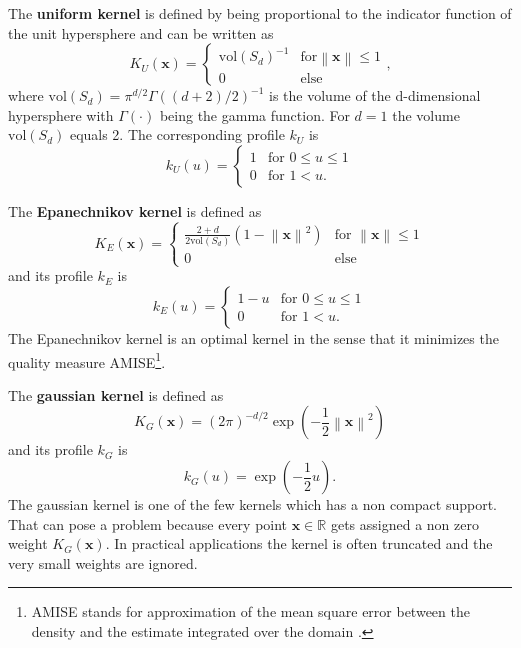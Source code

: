 \documentclass{article}
\newcommand{\norm}[1]{\left\lVert#1\right\rVert}
\begin{document}
The \textbf{uniform kernel} is defined by being proportional to the indicator function of the unit hypersphere and can be written as
\begin{equation}
	K_U(\bm{x}) = \begin{cases}
		\text{vol}(S_d)^{-1} & \text{for} \norm{\bm{x}} \leq 1\\
		0 & \text{else}
	\end{cases}\text{,}
\end{equation}
where $\text{vol}(S_d) = \pi^{d/2}\Gamma((d+2)/2)^{-1}$ is the volume of the d-dimensional hypersphere with $\Gamma(\cdot)$ being the gamma function. For $d=1$ the volume $\text{vol}(S_d)$ equals 2. The corresponding profile $k_U$ is
\begin{equation}
	k_U(u) = \begin{cases}
		1 & \text{for } 0 \leq u \leq 1\\
		0 & \text{for } 1 < u\text{.}
	\end{cases}
\end{equation}

The \textbf{Epanechnikov kernel} is defined as
\begin{equation}
	K_E(\bm{x}) = \begin{cases}
		\frac{2 + d}{2 \text{vol}(S_d)} (1 - \norm{\bm{x}}^2) & \text{for } \norm{\bm{x}} \leq 1\\
		0 & \text{else}
	\end{cases}
\end{equation}
and its profile $k_E$ is
\begin{equation}
	k_E(u) = \begin{cases}
		1 - u & \text{for } 0 \leq u \leq 1\\
		0 & \text{for } 1 < u\text{.}
	\end{cases}
\end{equation}
The Epanechnikov kernel is an optimal kernel in the sense that it minimizes the quality measure AMISE\footnote{AMISE stands for approximation of the mean square error between the density and the estimate integrated over the domain \citep[p. 5]{Comaniciu.2002}.}.

The \textbf{gaussian kernel} is defined as
\begin{equation}
	K_G(\bm{x}) = (2 \pi)^{-d/2} \exp\left(-\frac{1}{2} \norm{\bm{x}}^2\right)
\end{equation}
and its profile $k_G$ is
\begin{equation}
	k_G(u) = \exp\left(-\frac{1}{2}u\right)\text{.}
\end{equation}
The gaussian kernel is one of the few kernels which has a non compact support. That can pose a problem because every point $\bm{x}\in\mathbb{R}$ gets assigned a non zero weight $K_G(\bm{x})$. In practical applications the kernel is often truncated and the very small weights are ignored.
\end{document}
